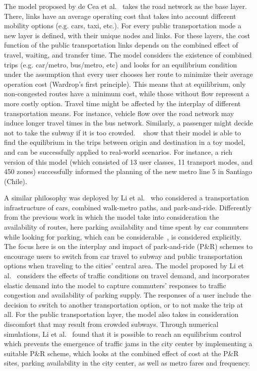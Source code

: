 The model proposed by de Cea et al.~\cite{decea2005equilibrium} takes the road network as the base layer. There, links have an average operating cost that takes into account different mobility options (e.g. cars, taxi, etc.). For every public transportation mode a new layer is defined, with their unique nodes and links. For these layers, the cost function of the public transportation links depends on the combined effect of travel, waiting, and transfer time. The model considers the existence of combined trips (e.g. car/metro, bus/metro, etc) and looks for an equilibrium condition under the assumption that every user chooses her route to minimize their average operation cost (Wardrop’s first principle). This means that at equilibrium, only non-congested routes have a minimum cost, while those without flow represent a more costly option. Travel time might be affected by the interplay of different transportation means. For instance, vehicle flow over the road network may induce longer travel times in the bus network. Similarly, a passenger might decide not to take the subway if it is too crowded. ~\cite{decea2005equilibrium} show that their model is able to find the equilibrium in the trips between origin and destination in a toy model, and can be successfully applied to real-world scenarios. For instance, a rich version of this model (which consisted of 13 user classes, 11 transport modes, and 450 zones) successfully informed the planning of the new metro line 5 in Santiago (Chile).

A similar philosophy was deployed by Li et al.~\cite{li2007parkride} who considered a transportation infrastructure of cars, combined walk-metro paths, and park-and-ride. Differently from the previous work in which the model take into consideration the availability of routes, here parking availability and time spent by car commuters while looking for parking, which can be considerable~\cite{shoup2017high}, is considered explicitly. The focus here is on the interplay and impact of park-and-ride (P\&R) schemes to encourage users to switch from car travel to subway and public transportation options when traveling to the cities' central area. The model proposed by Li et al.~\cite{li2007parkride} considers the effects of traffic conditions on travel demand, and incorporates elastic demand into the model to capture commuters’ responses to traffic congestion and availability of parking supply. The responses of a user include the decision to switch to another transportation option, or to not make the trip at all. For the public transportation layer, the model also takes in consideration discomfort that may result from crowded subways. Through numerical simulations, Li et al.~\cite{li2007parkride} found that it is possible to reach an equilibrium control which prevents the emergence of traffic jams in the city center by implementing a suitable P\&R scheme, which looks at the combined effect of cost at the P\&R sites, parking availability in the city center, as well as metro fares and frequency.

